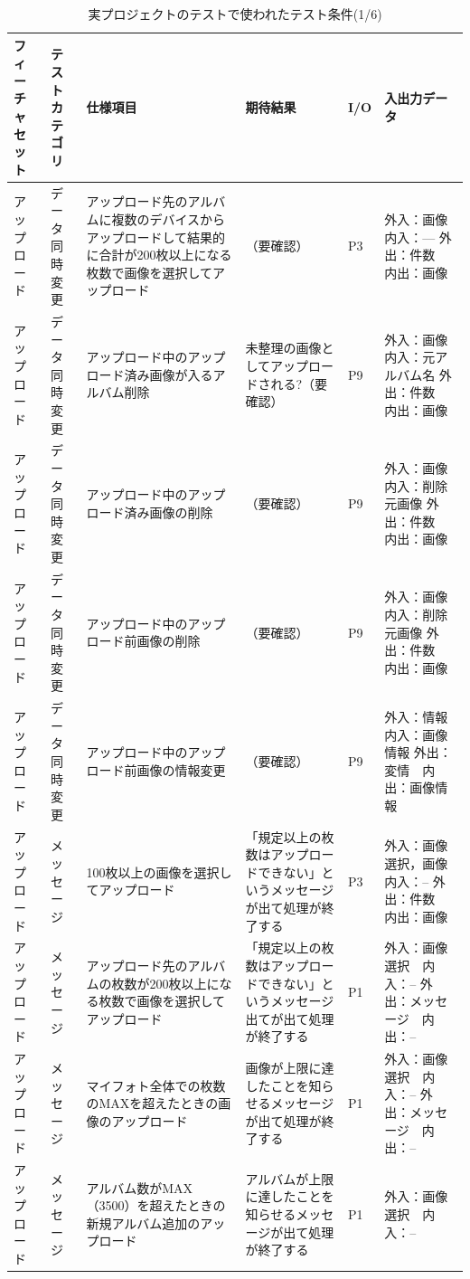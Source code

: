   \begin{table}[htbp]
    \scriptsize
    \centering
    \caption{実プロジェクトのテストで使われたテスト条件(1/6)}
    \begin{tabular}{|p{8em}|p{7em}|p{9em}|p{9em}|p{3em}|p{12em}|}
  \cline{1-6}   フィーチャセット & テストカテゴリ  & 仕様項目 & 期待結果  & I/O   & 入出力データ \bigstrut\\
      \hline
      \hline
    アップロード & データ同時変更 & アップロード先のアルバムに複数のデバイスからアップロードして結果的に合計が200枚以上になる枚数で画像を選択してアップロード & （要確認） & P3    & 外入：画像　内入：---
外出：件数　内出：画像 \bigstrut\\
    \hline
    アップロード & データ同時変更 & アップロード中のアップロード済み画像が入るアルバム削除 & 未整理の画像としてアップロードされる?（要確認） & P9    & 外入：画像　内入：元アルバム名
外出：件数　内出：画像 \bigstrut\\
    \hline
    アップロード & データ同時変更 & アップロード中のアップロード済み画像の削除 & （要確認） & P9    & 外入：画像　内入：削除元画像
外出：件数　内出：画像 \bigstrut\\
    \hline
    アップロード & データ同時変更 & アップロード中のアップロード前画像の削除 & （要確認） & P9    & 外入：画像　内入：削除元画像
外出：件数　内出：画像 \bigstrut\\
    \hline
    アップロード & データ同時変更 & アップロード中のアップロード前画像の情報変更 & （要確認） & P9    & 外入：情報　内入：画像情報
外出：変情　内出：画像情報 \bigstrut\\
    \hline
    アップロード & メッセージ & 100枚以上の画像を選択してアップロード & 「規定以上の枚数はアップロードできない」というメッセージが出て処理が終了する & P3    & 外入：画像選択，画像　内入：--
外出：件数　内出：画像 \bigstrut\\
    \hline
    アップロード & メッセージ & アップロード先のアルバムの枚数が200枚以上になる枚数で画像を選択してアップロード & 「規定以上の枚数はアップロードできない」というメッセージ出てが出て処理が終了する & P1    & 外入：画像選択　内入：--
外出：メッセージ　内出：-- \bigstrut\\
    \hline
    アップロード & メッセージ & マイフォト全体での枚数のMAXを超えたときの画像のアップロード & 画像が上限に達したことを知らせるメッセージが出て処理が終了する & P1    & 外入：画像選択　内入：--
外出：メッセージ　内出：-- \bigstrut\\
    \hline
    アップロード & メッセージ & アルバム数がMAX（3500）を超えたときの新規アルバム追加のアップロード & アルバムが上限に達したことを知らせるメッセージが出て処理が終了する & P1    & 外入：画像選択　内入：--

\end{tabular}
\end{table}
